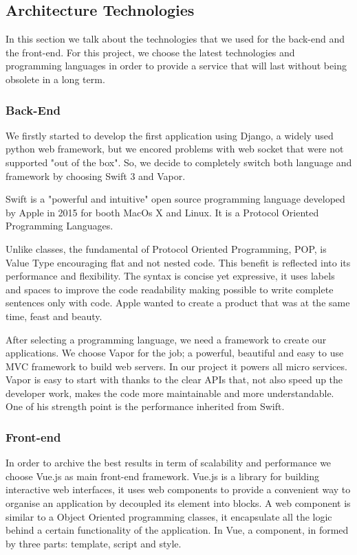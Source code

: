 \documentclass[]{usiinfbachelorproject}
\begin{document}
\subsection{Architecture Technologies}
In this section we talk about the technologies that we used for the back-end and the front-end. For this project, we choose the latest technologies and programming languages in order to provide a service that will last without being obsolete in a long term.
\subsubsection{Back-End}
We firstly started to develop the first application using Django, a widely used python web framework, but we encored problems with web socket that were not supported "out of the box".
So, we decide to completely switch both language and framework by choosing Swift 3 and Vapor.

Swift is a "powerful and intuitive" open source programming language developed by Apple in 2015 for booth MacOs X and Linux. It is a Protocol Oriented Programming Languages.

Unlike classes, the fundamental of Protocol Oriented Programming, POP, is Value Type encouraging flat and not nested code. This benefit is reflected into its performance and flexibility.
The syntax is concise yet expressive, it uses labels and spaces to improve the code readability making possible to write complete sentences only with code. Apple wanted to create a product that was at the same time, feast and beauty.

After selecting a programming language, we need a framework to create our applications. We choose Vapor for the job; a powerful, beautiful and easy to use MVC framework to build web servers. In our project it powers all micro services.
Vapor is easy to start with thanks to the clear APIs that, not also speed up the developer work, makes the code more maintainable and more understandable. One of his strength point is the performance inherited from Swift. \subsubsection{Front-end}
In order to archive the best results in term of scalability and performance we choose Vue.js as main front-end framework. Vue.js is a library for building interactive web interfaces, it uses web components to provide a convenient way to organise an application by decoupled its element into blocks.
A web component is similar to a Object Oriented programming classes, it encapsulate all the logic behind a certain functionality of the application. In Vue, a component, in formed by three parts: template, script and style.
\end{document}
